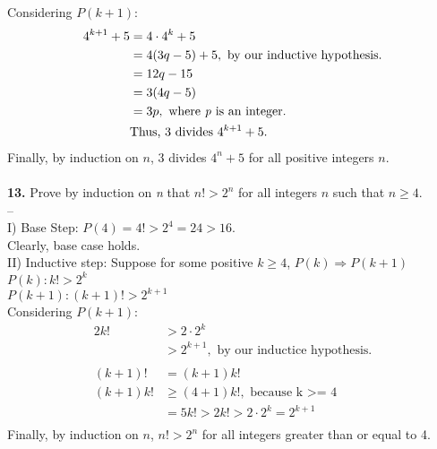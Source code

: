 \documentclass[paper=letter, fontsize=11pt]{scrartcl} %
\begin{document}
Considering $P(k+1):$
\begin{align*}
	4^{k+1} + 5 &= 4 \cdot 4^k + 5\\
	&= 4(3q - 5) + 5, \text{ by our inductive hypothesis.}\\
	&= 12q - 15 \\
	&= 3(4q - 5) \\
	&= 3p, \text{ where \textit{p} is an integer.}\\
	& \text{Thus, 3 divides } 4^{k+1} + 5.
\end{align*}
Finally, by induction on $n$, 3 divides $4^n + 5$ for all positive integers $n$.\\
\\

\textbf{13.} Prove by induction on \textit{n} that $n! > 2^n$ for all integers $n$ such that $n \ge 4$.
\\
--\\
I) Base Step: $P(4) = 4! > 2^4 = 24 > 16.$\\
Clearly, base case holds. \\

II) Inductive step: Suppose for some positive $k \ge 4$, $P(k) \Rightarrow P(k+1)$ \\
$P(k): k! > 2^k$ \\
$P(k+1): (k+1)! > 2^{k+1}$ \\
Considering $P(k+1):$
\begin{align*}
	2k! &> 2 \cdot 2^k \\
	&> 2^{k+1}, \text{ by our inductice hypothesis.}\\
	\\
	(k+1)! &= (k+1)k! \\
	(k+1)k! &\ge (4+1)k!, \text{ because k >= 4}\\ 
	&= 5k! > 2k! > 2 \cdot 2^k = 2^{k+1} \\
\end{align*}
Finally, by induction on $n$, $n! > 2^n$ for all integers greater than or equal to 4.
\end{document}

